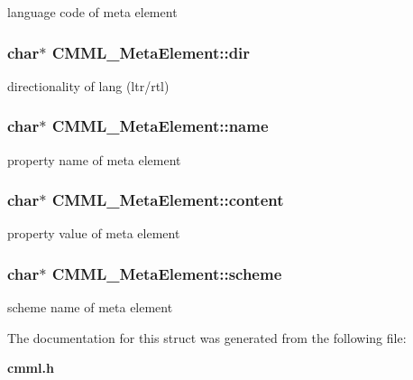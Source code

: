 language code of meta element 
\subsubsection{\setlength{\rightskip}{0pt plus 5cm}char$\ast$ {\bf CMML\_\-Meta\-Element::dir}}\label{structCMML__MetaElement_o2}


directionality of lang (ltr/rtl) 
\subsubsection{\setlength{\rightskip}{0pt plus 5cm}char$\ast$ {\bf CMML\_\-Meta\-Element::name}}\label{structCMML__MetaElement_o3}


property name of meta element 
\subsubsection{\setlength{\rightskip}{0pt plus 5cm}char$\ast$ {\bf CMML\_\-Meta\-Element::content}}\label{structCMML__MetaElement_o4}


property value of meta element 
\subsubsection{\setlength{\rightskip}{0pt plus 5cm}char$\ast$ {\bf CMML\_\-Meta\-Element::scheme}}\label{structCMML__MetaElement_o5}


scheme name of meta element 

The documentation for this struct was generated from the following file:\begin{CompactItemize}
\item 
{\bf cmml.h}\end{CompactItemize}
